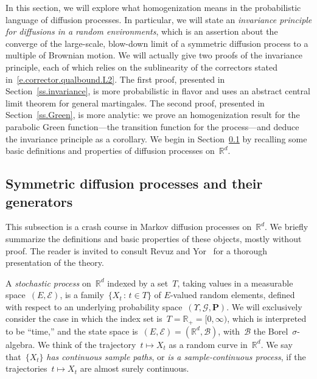 \documentclass[11pt]{article} %
\numberwithin{equation}{section}
\theoremstyle{definition}
\newcommand*{\R}{\ensuremath{\mathbb{R}}}
\newcommand*{\Rd}{\ensuremath{\mathbb{R}^d}}
\begin{document}
\smallskip

In this section, we will explore what homogenization means in the probabilistic language of diffusion processes. In particular, we will state an \emph{invariance principle for diffusions in a random environments}, which is an assertion about the converge of the large-scale, blow-down limit of a symmetric diffusion process to a multiple of Brownian motion. We will actually give two proofs of the invariance principle, each of which relies on the sublinearity of the correctors stated in~\eqref{e.corrector.qualbound.L2}. The first proof, presented in Section~\ref{ss.invariance}, is more probabilistic in flavor and uses an abstract central limit theorem for general martingales. The second proof, presented in Section~\ref{ss.Green}, is more analytic: we prove an homogenization result for the parabolic Green function---the transition function for the process---and deduce the invariance principle as a corollary. 
We begin in Section~\ref{ss.markov} by recalling some basic definitions and properties of diffusion processes on~$\Rd$. 


\subsection{Symmetric diffusion processes and their generators}
\label{ss.markov}

This subsection is a crash course in Markov diffusion processes on~$\Rd$. We briefly summarize the definitions and basic properties of these objects, mostly without proof. 
The reader is invited to consult Revuz and Yor~\cite{RY} for a thorough presentation of the theory.

\smallskip

A \emph{stochastic process} on~$\Rd$ indexed by a set~$T$, taking values in a measurable space~$(E, \mathscr{E})$, is a family~$\{ X_t\,:\,t\in T\}$ of $E$-valued random elements, defined with respect to an underlying probability space~$(\Upsilon, \mathcal{G}, \mathbf{P})$. 
We will exclusively consider the case in which the index set is~$T = \R_+ = [0,\infty)$, which is interpreted to be ``time,'' and the state space is~$(E,\mathscr{E}) = (\R^d,\mathscr{B})$, with~$\mathscr{B}$ the Borel~$\sigma$-algebra. 
We think of the trajectory~$t \mapsto X_t$ as a random curve in~$\Rd$. 
We say that~$\{ X_t\}$ \emph{has continuous sample paths}, or \emph{is a sample-continuous process}, if the trajectories~$t\mapsto X_t$ are almost surely continuous. 

\smallskip
\end{document}
